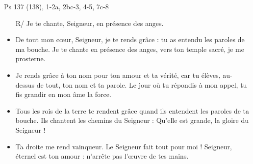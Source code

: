 Ps 137 (138), 1-2a, 2bc-3, 4-5, 7c-8
\begin{itemize}
\item[R/] Je te chante, Seigneur, en présence des anges.
\item
De tout mon cœur, Seigneur, je te rends grâce :
tu as entendu les paroles de ma bouche.
Je te chante en présence des anges,
vers ton temple sacré, je me prosterne.
\item
Je rends grâce à ton nom pour ton amour et ta vérité,
car tu élèves, au-dessus de tout, ton nom et ta parole.
Le jour où tu répondis à mon appel,
tu fis grandir en mon âme la force.
\item
Tous les rois de la terre te rendent grâce
quand ils entendent les paroles de ta bouche.
Ils chantent les chemins du Seigneur :
\og Qu’elle est grande, la gloire du Seigneur ! \fg
\item
Ta droite me rend vainqueur.
Le Seigneur fait tout pour moi !
Seigneur, éternel est ton amour :
n’arrête pas l’œuvre de tes mains.
\end{itemize}

